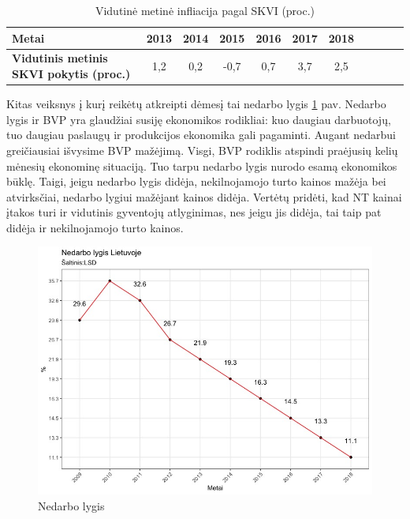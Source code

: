 \documentclass[11pt, titlepage]{article}
\begin{document}
\par
\begin{table}[H]
\begin{tabular}{|l|c|c|c|c|c|c|c|c|c|c|}
\hline
\textbf{Metai}  & 2013 & 2014 & 2015 & 2016 & 2017 & 2018 \\ \hline
\textbf{Vidutinis metinis SKVI pokytis (proc.)} & 1,2 & 0,2 & -0,7 & 0,7 & 3,7 & 2,5 \\ \hline
\end{tabular}
\caption{Vidutinė metinė infliacija pagal SKVI (proc.)}
\label{tab:my-table}
\end{table} 
\par
Kitas veiksnys į kurį reikėtų atkreipti dėmesį tai nedarbo lygis \ref{fig:Rplot4} pav.  Nedarbo lygis ir BVP yra glaudžiai susiję ekonomikos rodikliai: kuo daugiau darbuotojų, tuo daugiau paslaugų ir produkcijos ekonomika gali pagaminti. \parencite{azbainis2011pereinamojo}   Augant nedarbui greičiausiai išvysime  BVP mažėjimą. Visgi, BVP rodiklis atspindi praėjusių kelių mėnesių ekonominę situaciją. Tuo tarpu nedarbo lygis nurodo esamą ekonomikos būklę. Taigi, jeigu nedarbo lygis didėja, nekilnojamojo turto kainos mažėja bei atvirksčiai, nedarbo lygiui mažėjant kainos didėja.  Vertėtų pridėti, kad NT kainai įtakos turi ir vidutinis gyventojų atlyginimas, nes jeigu jis didėja, tai taip pat didėja ir nekilnojamojo turto kainos. 
\begin{figure}[H]
\center
\includegraphics[scale=0.5]{Rplot4}
\caption{Nedarbo lygis}
\label{fig:Rplot4}
\end{figure}
\newpage
\end{document}
